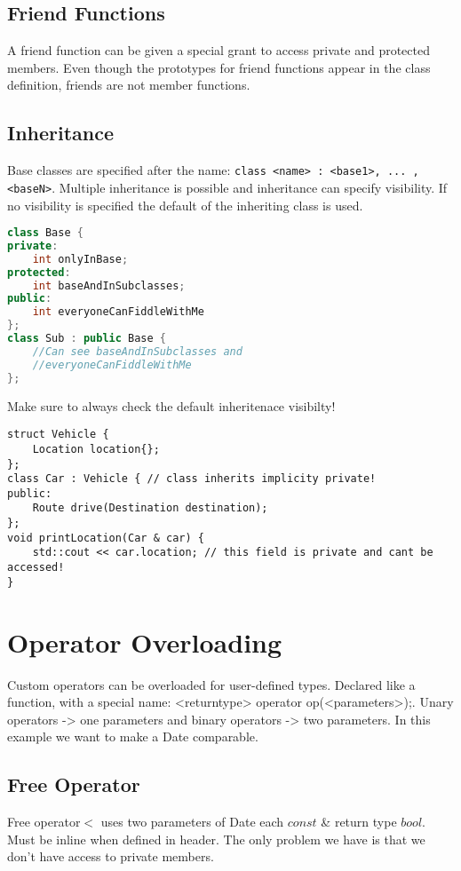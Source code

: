 \subsection{Friend Functions}
A friend function can be given a special grant to access private and protected members. Even though the prototypes for friend functions appear in the class definition, friends are not member functions.

\subsection{Inheritance}
 Base classes are specified after the name: \lstinline|class <name> : <base1>, ... , <baseN>|. Multiple inheritance is possible and inheritance can specify visibility. If no visibility is specified the default of the inheriting class is used.

\begin{lstlisting}[language=C++]
class Base { 
private:
	int onlyInBase; 
protected:
	int baseAndInSubclasses;
public:
	int everyoneCanFiddleWithMe 
};
class Sub : public Base {
	//Can see baseAndInSubclasses and
	//everyoneCanFiddleWithMe 
};	
\end{lstlisting}

Make sure to always check the default inheritenace visibilty!
\begin{lstlisting}
struct Vehicle {
	Location location{}; 
}; 
class Car : Vehicle { // class inherits implicity private!
public:
	Route drive(Destination destination); 
}; 
void printLocation(Car & car) {
	std::cout << car.location; // this field is private and cant be accessed!
}
\end{lstlisting}


\pagebreak
\section{Operator Overloading}
Custom operators can be overloaded for user-defined types. Declared like a function, with a special name: <returntype> operator op(<parameters>);. 
Unary operators -> one parameters and binary operators -> two parameters. In this example we want to make a Date comparable. 

\subsection{Free Operator}
Free operator$<$ uses two parameters of Date each $const$ \& return type $bool$. Must be inline when defined in header. The only problem we have is that we don't have access to private members.

